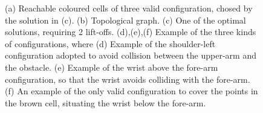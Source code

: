 \documentclass[journal]{IEEEtran}
\begin{document}
\begin{figure}[t]
\centering
{}
\caption{(a) Reachable coloured cells of three valid configuration, chosed by the solution in (c). 
(b) Topological graph. (c) One of the optimal solutions, requiring 2 lift-offs. 
(d),(e),(f) Example of the three kinds of configurations, where
(d) Example of the shoulder-left configuration adopted to avoid collision between the upper-arm and the obstacle. 
(e) Example of the wrist above the fore-arm configuration, so that the wrist avoids colliding with the fore-arm. 
(f) An example of the only valid configuration to cover the points in the brown cell, situating the wrist below the fore-arm.}\label{fig_realworld_with}
\end{figure}
\end{document}
